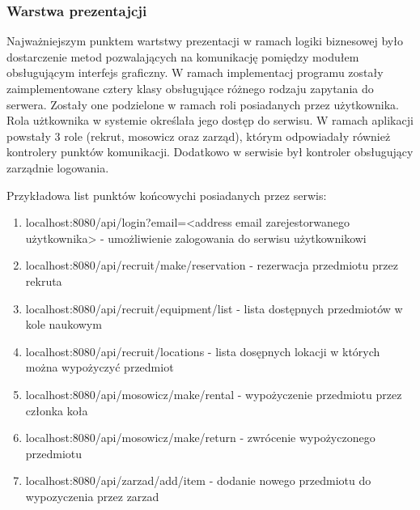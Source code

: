 \documentclass{article}
\begin{document}
\subsubsection{Warstwa prezentajcji}

Najważniejszym punktem wartstwy prezentacji w ramach logiki biznesowej było dostarczenie metod pozwalających na komunikację pomiędzy modułem obsługującym interfejs graficzny. W ramach implementacj 
programu zostały zaimplementowane cztery klasy obsługujące różnego rodzaju zapytania do serwera. Zostały one podzielone w ramach roli posiadanych przez użytkownika. Rola użtkownika w 
systemie określała jego dostęp do serwisu. W ramach aplikacji powstały 3 role (rekrut, mosowicz oraz zarząd), którym odpowiadały również kontrolery punktów komunikacji. Dodatkowo w serwisie był
kontroler obsługujący zarządnie logowania.

Przykładowa list punktów końcowychi posiadanych przez serwis:  

\begin{center}
    \begin{enumerate}
        \item localhost:8080/api/login?email=<address email zarejestorwanego użytkownika> - umożliwienie zalogowania do serwisu użytkownikowi \\
        \item localhost:8080/api/recruit/make/reservation - rezerwacja przedmiotu przez rekruta \\
        \item localhost:8080/api/recruit/equipment/list - lista dostępnych przedmiotów w kole naukowym \\
        \item localhost:8080/api/recruit/locations - lista dosępnych  lokacji w których można wypożyczyć przedmiot \\
        \item localhost:8080/api/mosowicz/make/rental - wypożyczenie przedmiotu przez członka koła \\
        \item localhost:8080/api/mosowicz/make/return - zwrócenie wypożyczonego przedmiotu \\ 
        \item localhost:8080/api/zarzad/add/item - dodanie nowego przedmiotu do wypozyczenia przez zarzad \\
    \end{enumerate}
\end{center}
\end{document}
